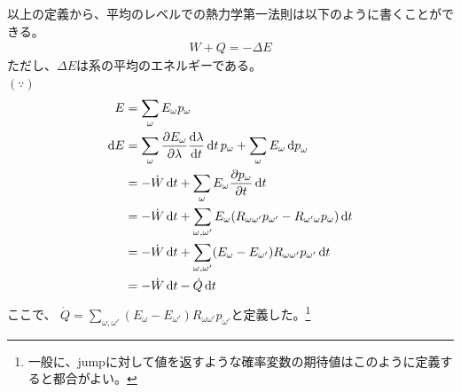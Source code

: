 \documentclass[a4paper,11pt]{jsarticle}
\numberwithin{equation}{section}
\begin{document}
  以上の定義から、平均のレベルでの熱力学第一法則は以下のように書くことができる。
  \begin{align}
    W + Q = -\Delta E
  \end{align}
  ただし、$\Delta E$は系の平均のエネルギーである。\\
  $(\because)$\\
\begin{align}
  E &= \sum_{\omega} E_{\omega} p_{\omega}\\
  \dd{E} &= \sum_{\omega} \pdv{E_{\omega}}{\lambda} \dv{\lambda}{t} \dd{t} p_{\omega} + \sum_{\omega} E_{\omega} \dd{p}_{\omega}\\
  &= -\dot{W} \dd{t} + \sum_{\omega} E_{\omega} \pdv{p_{\omega}}{t} \dd{t}\\
  &= -\dot{W} \dd{t} + \sum_{\omega,\omega'} E_{\omega} (R_{\omega \omega'}p_{\omega'} - R_{\omega' \omega} p_{\omega}) \dd{t}\\
  &= -\dot{W} \dd{t} + \sum_{\omega,\omega'} (E_{\omega} - E_{\omega'}) R_{\omega \omega'} p_{\omega'} \dd{t}\\
  &= -\dot{W} \dd{t}  -\dot{Q} \dd{t} 
\end{align}
ここで、
$\dot{Q} = \sum_{\omega,\omega'} (E_{\omega} - E_{\omega'}) R_{\omega \omega'} p_{\omega'}$と定義した。\footnote
{一般に、jumpに対して値を返すような確率変数の期待値はこのように定義すると都合がよい。
}

  
\end{document}
